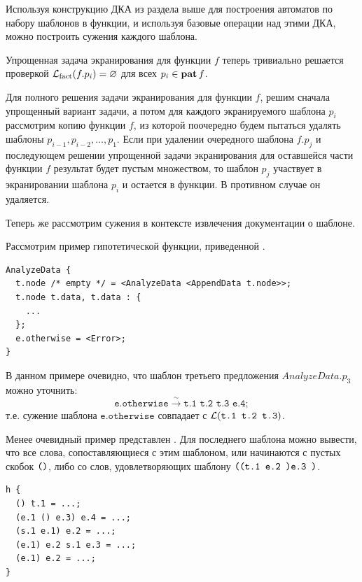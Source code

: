 Используя конструкцию ДКА из раздела выше для построения автоматов по набору шаблонов 
в функции, и используя базовые операции над этими ДКА, можно построить сужения каждого шаблона.

Упрощенная задача экранирования для функции $f$ теперь тривиально решается проверкой $\mathcal{L}_{\text{fact}}(f.p_i) = \varnothing$ для всех $p_i \in \operatorname{\textbf{pat}} f$.

Для полного решения задачи экранирования для функции $f$, решим сначала упрощенный вариант задачи, а потом для каждого экранируемого шаблона $p_i$ рассмотрим копию 
функции $f$, из которой поочередно будем пытаться удалять шаблоны $p_{i-1}, p_{i-2}, \dots, p_1$. Если при удалении очередного шаблона $f.p_j$ и последующем решении упрощенной задачи экранирования для оставшейся части функции $f$ результат будет пустым множеством, то шаблон $p_j$ участвует в экранировании шаблона $p_i$ и остается в функции. В противном случае он удаляется.

Теперь же рассмотрим сужения в контексте извлечения документации о шаблоне.

Рассмотрим пример гипотетической функции, приведенной .
\begin{listing}[H]
\caption{Простой пример уточняемого шаблона в определении функции (в диалекте \RL)}
\label{lst:prefix1}
\begin{verbatim}
AnalyzeData {
  t.node /* empty */ = <AnalyzeData <AppendData t.node>>;
  t.node t.data, t.data : {
    ...
  };
  e.otherwise = <Error>;
}
\end{verbatim}
\end{listing}

В данном примере очевидно, что шаблон третьего предложения $AnalyzeData.p_3$ можно уточнить:
$$
\texttt{e.otherwise} \xrightarrow{\sim}  \texttt{t.1 t.2 t.3 e.4};
$$
т.е. сужение шаблона $\texttt{e.otherwise}$ совпадает с $\mathcal{L}(\texttt{t.1 t.2 t.3})$.

Менее очевидный пример представлен .
Для последнего шаблона можно вывести, что все слова, сопоставляющиеся с этим шаблоном, или начинаются 
с пустых скобок $\textnormal{\texttt{(}} \textnormal{\texttt{)}}$, либо со слов, удовлетворяющих шаблону $\texttt{\textnormal{\texttt{(}}\textnormal{\texttt{(}}t.1 e.2 \textnormal{\texttt{)}}e.3 \textnormal{\texttt{)}}}$.

\begin{listing}[H]
\caption{Нетривиальный пример уточняемого шаблона в определении функции}
\label{lst:prefix2}
\begin{verbatim}
h {
  () t.1 = ...;
  (e.1 () e.3) e.4 = ...;
  (s.1 e.1) e.2 = ...;
  (e.1) e.2 s.1 e.3 = ...;
  (e.1) e.2 = ...;
}
\end{verbatim}
\end{listing}

